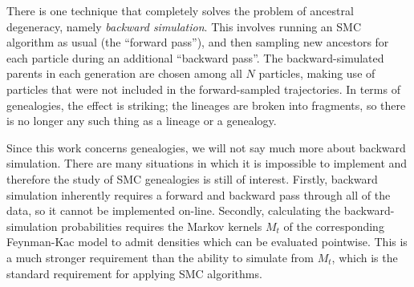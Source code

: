 There is one technique that completely solves the problem of ancestral degeneracy, namely \emph{backward simulation}\seb{[citation]}. This involves running an SMC algorithm as usual (the ``forward pass''), and then sampling new ancestors for each particle during an additional ``backward pass''. 
The backward-simulated parents in each generation are chosen among all $N$ particles, making use of particles that were not included in the forward-sampled trajectories.
In terms of genealogies, the effect is striking; the lineages are broken into fragments, so there is no longer any such thing as a lineage or a genealogy.

Since this work concerns genealogies, we will not say much more about backward simulation. There are many situations in which it is impossible to implement and therefore the study of SMC genealogies is still of interest. 
Firstly, backward simulation inherently requires a forward and backward pass through all of the data, so it cannot be implemented on-line. 
Secondly, calculating the backward-simulation probabilities requires the Markov kernels $M_t$ of the corresponding Feynman-Kac model to admit densities which can be evaluated pointwise. This is a much stronger requirement than the ability to simulate from $M_t$, which is the standard requirement for applying SMC algorithms.




